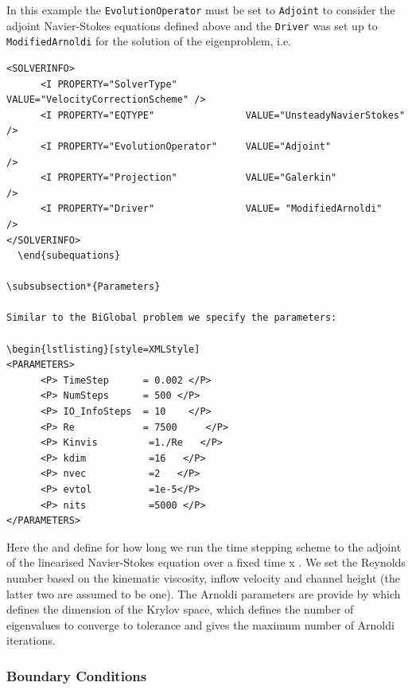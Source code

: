 In this example the \texttt{EvolutionOperator} must be set to
\texttt{Adjoint} to consider the adjoint Navier-Stokes equations
defined above and the \texttt{Driver} was set up to
\texttt{ModifiedArnoldi} for the solution of the eigenproblem, i.e.

    \begin{lstlisting}[style=XMLStyle]
<SOLVERINFO>
      <I PROPERTY="SolverType"            VALUE="VelocityCorrectionScheme" />
      <I PROPERTY="EQTYPE"                VALUE="UnsteadyNavierStokes"     />
      <I PROPERTY="EvolutionOperator"     VALUE="Adjoint"                  />
      <I PROPERTY="Projection"            VALUE="Galerkin"                 />
      <I PROPERTY="Driver"                VALUE= "ModifiedArnoldi"         />
</SOLVERINFO>
  \end{subequations}

\subsubsection*{Parameters}

Similar to the BiGlobal problem we specify the parameters: 

\begin{lstlisting}[style=XMLStyle]
<PARAMETERS>
      <P> TimeStep      = 0.002 </P>
      <P> NumSteps      = 500 </P>
      <P> IO_InfoSteps  = 10    </P>
      <P> Re            = 7500     </P>
      <P> Kinvis         =1./Re   </P>
      <P> kdim           =16   </P>
      <P> nvec           =2   </P>
      <P> evtol          =1e-5</P>
      <P> nits           =5000 </P>
</PARAMETERS>
  \end{lstlisting}

    Here the  and  define for how long
    we run the time stepping scheme to the adjoint of the linearised
    Navier-Stokes equation over a fixed time  x
    . We set the Reynolds number based on the
    kinematic viscosity, inflow velocity and channel height (the
    latter two are assumed to be one). The Arnoldi parameters are
    provide by  which defines the dimension of the Krylov
    space,  which defines the number of eigenvalues to
    converge to tolerance  and  gives the
    maximum number of Arnoldi iterations.


    \subsubsection*{Boundary Conditions}

